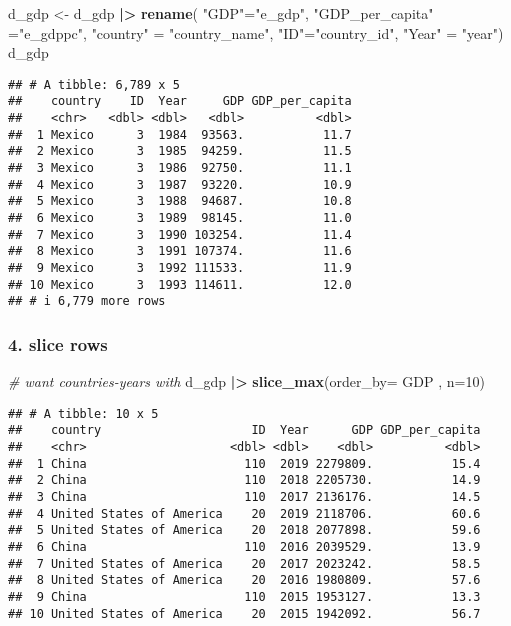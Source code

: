 \documentclass[
]{article}
\newenvironment{Shaded}{\begin{snugshade}}{\end{snugshade}}
\newcommand{\AttributeTok}[1]{\textcolor[rgb]{0.13,0.29,0.53}{#1}}
\newcommand{\CommentTok}[1]{\textcolor[rgb]{0.56,0.35,0.01}{\textit{#1}}}
\newcommand{\DecValTok}[1]{\textcolor[rgb]{0.00,0.00,0.81}{#1}}
\newcommand{\FunctionTok}[1]{\textcolor[rgb]{0.13,0.29,0.53}{\textbf{#1}}}
\newcommand{\NormalTok}[1]{#1}
\newcommand{\OtherTok}[1]{\textcolor[rgb]{0.56,0.35,0.01}{#1}}
\newcommand{\SpecialCharTok}[1]{\textcolor[rgb]{0.81,0.36,0.00}{\textbf{#1}}}
\newcommand{\StringTok}[1]{\textcolor[rgb]{0.31,0.60,0.02}{#1}}
\begin{document}
\begin{Shaded}
\begin{Highlighting}[]
\NormalTok{d\_gdp }\OtherTok{\textless{}{-}}\NormalTok{ d\_gdp }\SpecialCharTok{|\textgreater{}}
  \FunctionTok{rename}\NormalTok{( }\StringTok{"GDP"}\OtherTok{=}\StringTok{"e\_gdp"}\NormalTok{, }\StringTok{"GDP\_per\_capita"} \OtherTok{=}\StringTok{"e\_gdppc"}\NormalTok{, }\StringTok{"country"} \OtherTok{=} \StringTok{"country\_name"}\NormalTok{, }\StringTok{"ID"}\OtherTok{=}\StringTok{"country\_id"}\NormalTok{, }\StringTok{"Year"} \OtherTok{=} \StringTok{"year"}\NormalTok{)}
\NormalTok{d\_gdp}
\end{Highlighting}
\end{Shaded}

\begin{verbatim}
## # A tibble: 6,789 x 5
##    country    ID  Year     GDP GDP_per_capita
##    <chr>   <dbl> <dbl>   <dbl>          <dbl>
##  1 Mexico      3  1984  93563.           11.7
##  2 Mexico      3  1985  94259.           11.5
##  3 Mexico      3  1986  92750.           11.1
##  4 Mexico      3  1987  93220.           10.9
##  5 Mexico      3  1988  94687.           10.8
##  6 Mexico      3  1989  98145.           11.0
##  7 Mexico      3  1990 103254.           11.4
##  8 Mexico      3  1991 107374.           11.6
##  9 Mexico      3  1992 111533.           11.9
## 10 Mexico      3  1993 114611.           12.0
## # i 6,779 more rows
\end{verbatim}

\hypertarget{slice-rows}{%
\subsubsection{4. slice rows}\label{slice-rows}}

\begin{Shaded}
\begin{Highlighting}[]
\CommentTok{\# want countries{-}years with }
\NormalTok{d\_gdp }\SpecialCharTok{|\textgreater{}}
  \FunctionTok{slice\_max}\NormalTok{(}\AttributeTok{order\_by=}\NormalTok{ GDP , }\AttributeTok{n=}\DecValTok{10}\NormalTok{)}
\end{Highlighting}
\end{Shaded}

\begin{verbatim}
## # A tibble: 10 x 5
##    country                     ID  Year      GDP GDP_per_capita
##    <chr>                    <dbl> <dbl>    <dbl>          <dbl>
##  1 China                      110  2019 2279809.           15.4
##  2 China                      110  2018 2205730.           14.9
##  3 China                      110  2017 2136176.           14.5
##  4 United States of America    20  2019 2118706.           60.6
##  5 United States of America    20  2018 2077898.           59.6
##  6 China                      110  2016 2039529.           13.9
##  7 United States of America    20  2017 2023242.           58.5
##  8 United States of America    20  2016 1980809.           57.6
##  9 China                      110  2015 1953127.           13.3
## 10 United States of America    20  2015 1942092.           56.7
\end{verbatim}
\end{document}
